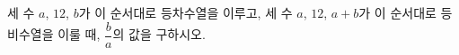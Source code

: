 세 수 $a$, $12$, $b$가 이 순서대로 등차수열을 이루고, 세 수 $a$, $12$, $a+b$가 이 순서대로 등비수열을 이룰 때, $\dfrac{b}{a}$의 값을 구하시오.
